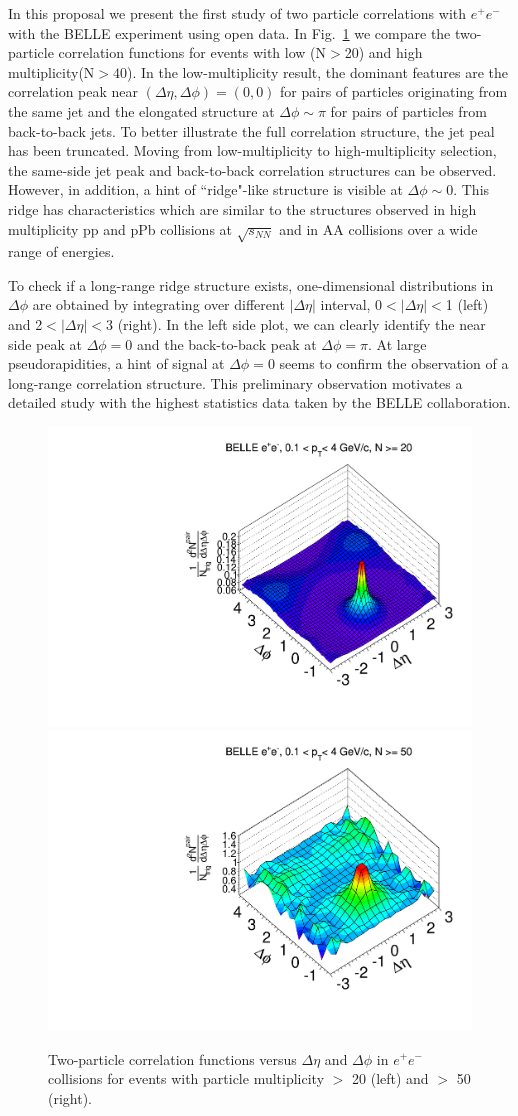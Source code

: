 In this proposal we present the first study of two particle correlations with $e^{+}e^{-}$ with the BELLE experiment using open data.
In Fig.~\ref{fig:ridgeBelle} we compare the two-particle correlation functions for events with low (N$>$20) and high multiplicity(N$>40$). 
In the low-multiplicity result, the dominant features are the correlation peak near $(\Delta\eta,\Delta\phi)=(0,0)$ for pairs of particles originating from the same jet 
and the elongated structure at $\Delta\phi\sim\pi$ for pairs of particles from back-to-back jets. To better illustrate the full correlation structure, the jet peal has been truncated.
Moving from low-multiplicity to high-multiplicity selection, the same-side jet peak and back-to-back correlation structures can be observed. 
However, in addition, a hint of ``ridge"-like structure is visible at $\Delta\phi \sim$0. This ridge has characteristics which are similar to the structures
observed in high multiplicity pp and pPb collisions at $\sqrt{s_{NN}}$ and in AA collisions over a wide range of energies.

To check if a long-range ridge structure exists, one-dimensional distributions in $\Delta\phi$ are obtained by integrating over different $|\Delta\eta|$ interval, 0$<|\Delta \eta|<$1 (left) and 
2$<|\Delta \eta|<$3 (right). In the left side plot, we can clearly identify the near side peak at $\Delta\phi=$0 and the back-to-back peak at $\Delta\phi=\pi$. At large pseudorapidities, 
a hint of signal at $\Delta\phi=0$ seems to confirm the observation of a long-range correlation structure. This preliminary observation motivates a detailed study with the highest 
statistics data taken by the BELLE collaboration. 

\begin{figure}[!htb]
\begin{center}
\includegraphics[width=.45\textwidth]{figures/canvasRidgeBelleMult20CutHigh0.pdf}
\includegraphics[width=.45\textwidth]{figures/canvasRidgeBelleMult50CutHigh0.pdf}
\caption{Two-particle correlation functions versus $\Delta\eta$ and $\Delta\phi$ in $e^{+}e^{-}$ collisions for events with particle multiplicity $>$ 20 (left) and  $>$ 50 (right).}
\label{fig:ridgeBelle} 
\end{center}
\end{figure}

